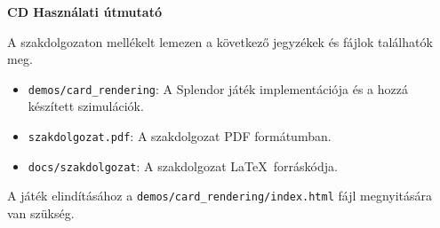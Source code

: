 \pagestyle{empty}

\noindent \textbf{\Large CD Használati útmutató}

\vskip 1cm

\noindent A szakdolgozaton mellékelt lemezen a következő jegyzékek és fájlok találhatók meg.

\begin{itemize}
	\item \texttt{demos/card\_rendering}: A Splendor játék implementációja és a hozzá készített szimulációk.
	\item \texttt{szakdolgozat.pdf}: A szakdolgozat PDF formátumban.
	\item \texttt{docs/szakdolgozat}: A szakdolgozat \LaTeX\ forráskódja.
\end{itemize}

\bigskip

\noindent A játék elindításához a \texttt{demos/card\_rendering/index.html} fájl megnyitására van szükség.



